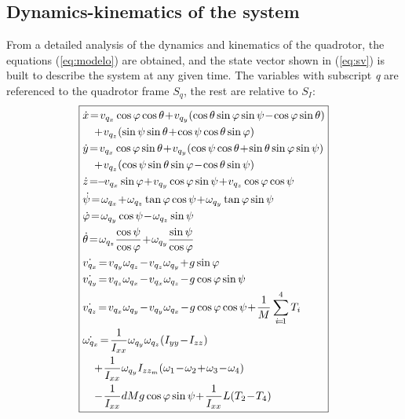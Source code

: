 \documentclass[conference]{IEEEtran}
\newcommand{\refp}[1]{(\ref{#1})}
\begin{document}
\subsection{Dynamics-kinematics of the system}
\label{sec:modelo-dyn-kin}

From a detailed analysis of the dynamics and kinematics of the quadrotor, the equations \refp{eq:modelo} are obtained, and the state vector shown in \refp{eq:sv} is built to describe the system at any given time. The variables with subscript \textit{q} are referenced to the quadrotor frame $S_q$, the rest are relative to $S_I$:
\begin{equation}
\small
\boxed{\begin{aligned}&\dot{x}\!=\!v_{q_x} \cos \varphi \cos \theta \!+\! v_{q_y} ( \cos \theta \sin \varphi \sin \psi\!-\!\cos \varphi \sin \theta )\\
&\quad \!+\! v_{q_z}(\sin \psi \sin \theta \!+\! \cos \psi \cos \theta \sin \varphi)\\
&\dot{y}\!=\!v_{q_x} \cos \varphi \sin \theta \!+\! v_{q_y} (\cos \psi \cos \theta \!+\! \sin \theta \sin \varphi \sin \psi)\\
&\quad\!+\! v_{q_z}( \cos \psi \sin \theta \sin \varphi\!-\!\cos \theta \sin \psi )\\
&\dot{z}\!=\! \!-\!v_{q_x} \sin \varphi  \!+\! v_{q_y} \cos \varphi \sin \psi  \!+\! v_{q_z}\cos \varphi \cos \psi\\
&\dot{\psi}\!=\!\omega_{q_x} \!+\! \omega_{q_z}\tan\varphi \cos\psi \!+\! \omega_{q_y}\tan\varphi \sin\psi\\
&\dot{\varphi}\!=\!\omega_{q_y}\cos \psi \!-\! \omega_{q_z}\sin\psi\\
&\dot{\theta}\!=\!\omega_{q_z} \frac{\cos\psi}{\cos\varphi}  \!+\! \omega_{q_y}\frac{\sin\psi}{\cos\varphi}\\
&\dot{v_{q_x}}\!=\!v_{q_y} \omega_{q_z} \!-\! v_{q_z} \omega_{q_y}\!+\!g\sin\varphi\\
&\dot{v_{q_y}}\!=\!v_{q_z} \omega_{q_x} \!-\! v_{q_x} \omega_{q_z}\!-\!g\cos\varphi\sin\psi\\
&\dot{v_{q_z}}\!=\!v_{q_x} \omega_{q_y} \!-\! v_{q_y} \omega_{q_x}\!-\!g\cos\varphi\cos\psi\!+\!\frac{1}{M}\sum_{i\!=\!1}^4T_i\\
&\dot{\omega_{q_x}}\!=\!\frac{1}{I_{xx}}\omega_{q_y}\omega_{q_z}(I_{yy}\!-\!I_{zz})\\
&\quad\!+\!\frac{1}{I_{xx}}\omega_{q_y}I_{zz_m}(\omega_1\!-\!\omega_2\!+\!\omega_3\!-\!\omega_4)\\
&\quad\!-\!\frac{1}{I_{xx}}dMg\cos\varphi\sin\psi\!+\!\frac{1}{I_{xx}}L(T_2\!-\!T_4)\\

\end{aligned}}
\end{equation}
\end{document}
